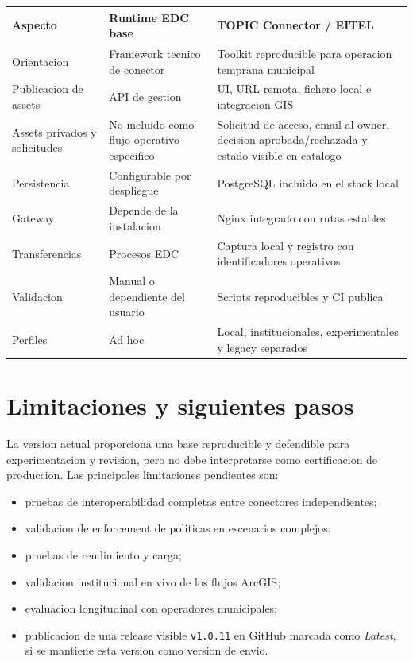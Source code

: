 \documentclass{article}
\begin{document}
\begin{longtable}{|p{4.5cm}|p{4.5cm}|p{5.5cm}|}
\hline
\textbf{Aspecto} & \textbf{Runtime EDC base} & \textbf{TOPIC Connector / EITEL} \\
\hline
Orientacion & Framework tecnico de conector & Toolkit reproducible para operacion temprana municipal \\
\hline
Publicacion de assets & API de gestion & UI, URL remota, fichero local e integracion GIS \\
\hline
Assets privados y solicitudes & No incluido como flujo operativo especifico & Solicitud de acceso, email al owner, decision aprobada/rechazada y estado visible en catalogo \\
\hline
Persistencia & Configurable por despliegue & PostgreSQL incluido en el stack local \\
\hline
Gateway & Depende de la instalacion & Nginx integrado con rutas estables \\
\hline
Transferencias & Procesos EDC & Captura local y registro con identificadores operativos \\
\hline
Validacion & Manual o dependiente del usuario & Scripts reproducibles y CI publica \\
\hline
Perfiles & Ad hoc & Local, institucionales, experimentales y legacy separados \\
\hline
\end{longtable}

\section{Limitaciones y siguientes pasos}

La version actual proporciona una base reproducible y defendible para experimentacion y revision, pero no debe interpretarse como certificacion de produccion. Las principales limitaciones pendientes son:

\begin{itemize}[leftmargin=1.2cm]
    \item pruebas de interoperabilidad completas entre conectores independientes;
    \item validacion de enforcement de politicas en escenarios complejos;
    \item pruebas de rendimiento y carga;
    \item validacion institucional en vivo de los flujos ArcGIS;
    \item evaluacion longitudinal con operadores municipales;
    \item publicacion de una release visible \texttt{v1.0.11} en GitHub marcada como \textit{Latest}, si se mantiene esta version como version de envio.
\end{itemize}
\end{document}
